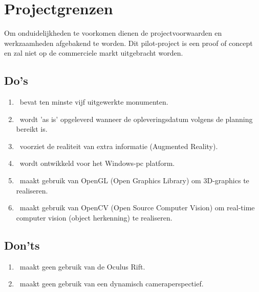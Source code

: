 \chapter{Projectgrenzen} \label{cha:projectgrenzen}
Om onduidelijkheden te voorkomen dienen de projectvoorwaarden en werkzaamheden afgebakend te worden. Dit pilot-project is een proof of concept en zal niet op de commerciele markt uitgebracht worden.
\\
\section{Do's} \label{sec:do's}
\begin{enumerate}
  \item \projectname\ bevat ten minste vijf uitgewerkte monumenten.
  \item \projectname\ wordt 'as is' opgeleverd wanneer de opleveringsdatum volgens de planning bereikt is.
  \item \projectname\ voorziet de realiteit van extra informatie (Augmented Reality).
  \item \projectname\ wordt ontwikkeld voor het Windows-pc platform.
  \item \projectname\ maakt gebruik van OpenGL (Open Graphics Library) om 3D-graphics te realiseren.
  \item \projectname\ maakt gebruik van OpenCV (Open Source Computer Vision) om real-time computer vision (object herkenning) te realiseren.
\end{enumerate}
\section{Don'ts} \label{sec:don'ts}
\begin{enumerate}
  \item \projectname\ maakt geen gebruik van de Oculus Rift.
  \item \projectname\ maakt geen gebruik van een dynamisch cameraperspectief.
\end{enumerate}